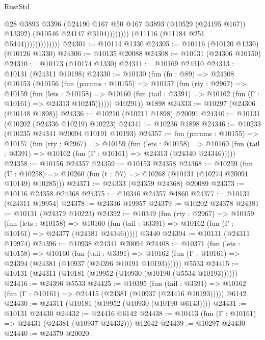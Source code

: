 \begin{lexlean}{RustStd}
\begin{coremodule}
                                        @28
                                        @3893
                                        @3396
                                        (@24190 @167 @50 @167 @3893 (@10529 (@24195 @167)) @13392)
                                        (@10546 @24147 @3104))))))))
                          (@11116 (@11184 @251 @5444)))))))))))))
@24301 := @10114 @1330
@24305 := @10116 (@10120 @1330) (@10126 @1330)
@24306 := @10135 @20088
@24308 := @10131 (@24306 @10150)
@24310 := @10173 (@10174 @1330)
@24311 := @10169 @24310
@24313 := @10131 (@24311 @10198)
@24330 := @10130
    (fun (fn : @89) =>
    @24308
      (@10153
        (@10156
          (fun (params : @10155) =>
          @10157
            (fun (rty : @2967) =>
            @10159
              (fun (lets : @10158) =>
              @10160 (fun (tail : @3391) => @10162 (fun (Γ : @10161) => @24313 @10245))))))
        @10291))
    @1898
@24333 := @10297 (@24306 (@10148 @1898))
@24336 := @10210 (@10211 @1898) @20091
@24340 := @10131 (@10202 (@24336 @10219) @10223)
@24341 := @10236 @1898
@24346 := @10233 (@10235 @24341 @20094 @10191 @10193)
@24357 := fun (params : @10155) =>
  @10157
    (fun (rty : @2967) =>
    @10159
      (fun (lets : @10158) =>
      @10160 (fun (tail : @3391) => @10162 (fun (Γ : @10161) => @24313 (@24340 @24346)))))
@24358 := @10156 @24357
@24359 := @10153 @24358
@24368 := @10259
    (fun (U : @10258) => @10260 (fun (t : @7) => @10268 (@10131 (@10274 @20091 @10149) @10285)))
@24371 := @24333 (@24359 @24368) @20089
@24373 := @10116 @24358 @24368
@24375 := @10346 @24357 @4860
@24377 := @10131 (@24311 @19954)
@24378 := @24336 @19957
@24379 := @10202 @24378
@24381 := @10131 (@24379 @10223)
@24392 := @10349
    (fun (rty : @2967) =>
    @10159
      (fun (lets : @10158) =>
      @10160 (fun (tail : @3391) => @10162 (fun (Γ : @10161) => @24377 (@24381 @24346)))))
    @3440
@24394 := @10131 (@24311 @19974)
@24396 := @10938 @24341 @20094
@24408 := @10371
    (fun (lets : @10158) =>
    @10160
      (fun (tail : @3391) =>
      @10162 (fun (Γ : @10161) => @24394 (@24381 (@10937 (@24396 @10191 @10193))))))
    @5533
@24415 := @10131 (@24311 (@10181 (@19952 (@10930 (@10190 (@5534 @10193))))))
@24416 := @24396 @5533
@24425 := @10395
    (fun (tail : @3391) => @10162 (fun (Γ : @10161) => @24415 (@24381 (@10937 (@24416 @10193)))))
    @6142
@24430 := @24311 (@10181 (@19952 (@10930 (@10190 @6143))))
@24431 := @10131 @24430
@24432 := @24416 @6142
@24438 := @10413 (fun (Γ : @10161) => @24431 (@24381 (@10937 @24432))) @12642
@24439 := @10297 @24430
@24440 := @24379 @20020

\end{coremodule}
\end{lexlean}
